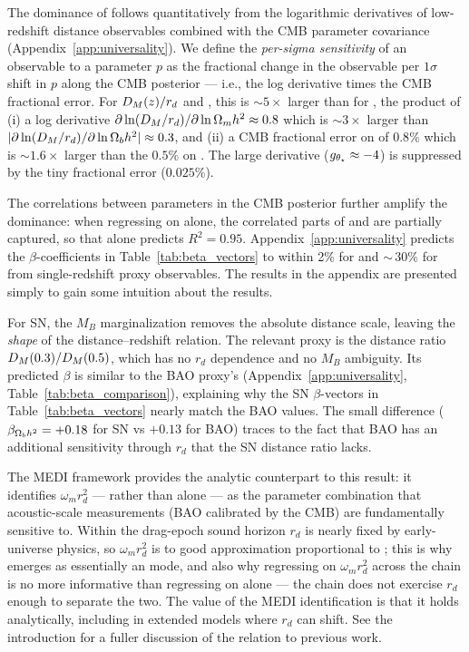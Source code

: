 The dominance of \omh follows quantitatively from the logarithmic derivatives of low-redshift distance observables combined with the CMB parameter covariance (Appendix~\ref{app:universality}). We define the \emph{per-sigma sensitivity} of an observable to a parameter $p$ as the fractional change in the observable per $1\sigma$ shift in $p$ along the CMB posterior --- i.e., the log derivative times the CMB fractional error. For $D_M(z)/r_d$ and \omh, this is $\sim 5\times$ larger than for \obh, the product of (i) a log derivative $\partial \ln(D_M/r_d)/\partial \ln \Omega_m h^2 \approx 0.8$ which is $\sim 3\times$ larger than $|\partial\ln(D_M/r_d)/\partial\ln \Omega_b h^2| \approx 0.3$, and (ii) a CMB fractional error on \omh of $0.8\%$ which is $\sim 1.6\times$ larger than the $0.5\%$ on \obh. The large \thetastar derivative ($g_{\theta_\star} \approx -4$) is suppressed by the tiny fractional error ($0.025\%$). 

The correlations between parameters in the CMB posterior further amplify the \omh dominance: when regressing on \omh alone, the correlated parts of \obh and \thetastar are partially captured, so that \omh alone predicts $R^2 = 0.95$. Appendix~\ref{app:universality} predicts the $\beta$-coefficients in Table~\ref{tab:beta_vectors} to within 2\% for \omh and ${\sim}\,30\%$ for \obh from single-redshift proxy observables. The results in the appendix are presented simply to gain some intuition about the results. 

For SN, the $M_B$ marginalization removes the absolute distance scale, leaving the \emph{shape} of the distance--redshift relation. The relevant proxy is the distance ratio $D_M(0.3)/D_M(0.5)$, which has no $r_d$ dependence and no $M_B$ ambiguity. Its predicted $\beta$ is similar to the BAO proxy's (Appendix~\ref{app:universality}, Table~\ref{tab:beta_comparison}), explaining why the SN $\beta$-vectors in Table~\ref{tab:beta_vectors} nearly match the BAO values. The small difference ($\beta_{\Omega_b h^2} = +0.18$ for SN vs $+0.13$ for BAO) traces to the fact that BAO has an additional \obh sensitivity through $r_d$ that the SN distance ratio lacks.

The MEDI framework \citep{Weiner2026_MEDI} provides the analytic counterpart to this result: it identifies $\omega_m r_d^2$ --- rather than \omh alone --- as the parameter combination that acoustic-scale measurements (BAO calibrated by the CMB) are fundamentally sensitive to. Within \LCDM the drag-epoch sound horizon $r_d$ is nearly fixed by early-universe physics, so $\omega_m r_d^2$ is to good approximation proportional to \omh; this is why \czero emerges as essentially an \omh mode, and also why regressing \czero on $\omega_m r_d^2$ across the \LCDM chain is no more informative than regressing on \omh alone --- the chain does not exercise $r_d$ enough to separate the two. The value of the MEDI identification is that it holds analytically, including in extended models where $r_d$ can shift. See the introduction for a fuller discussion of the relation to previous work.

